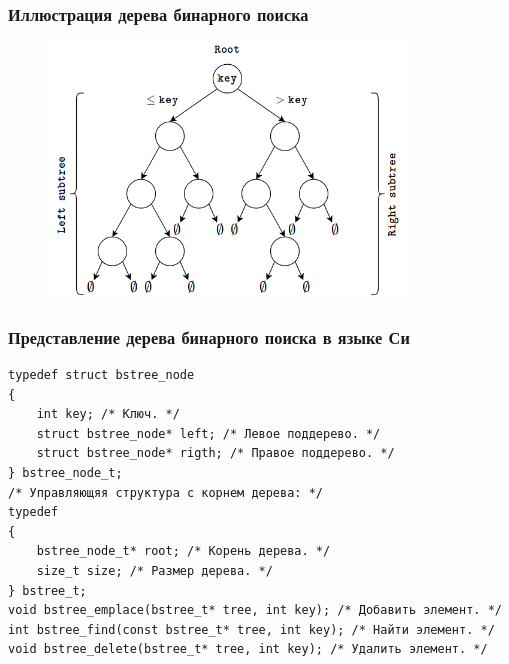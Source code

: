 \documentclass{beamer}
\begin{document}
    \begin{frame}[fragile]
        \frametitle{Иллюстрация дерева бинарного поиска}
        \begin{figure}[!tbp]
           \centering
           \includegraphics[width=0.85\textwidth]{pics/tree.png}
        \end{figure}
    \end{frame}
    \begin{frame}[fragile]
        \frametitle{Представление дерева бинарного поиска в языке Си}
        \begin{verbatim}
typedef struct bstree_node
{
    int key; /* Ключ. */
    struct bstree_node* left; /* Левое поддерево. */
    struct bstree_node* rigth; /* Правое поддерево. */
} bstree_node_t;
/* Управляющяя структура с корнем дерева: */
typedef 
{
    bstree_node_t* root; /* Корень дерева. */
    size_t size; /* Размер дерева. */
} bstree_t;
void bstree_emplace(bstree_t* tree, int key); /* Добавить элемент. */
int bstree_find(const bstree_t* tree, int key); /* Найти элемент. */
void bstree_delete(bstree_t* tree, int key); /* Удалить элемент. */
        \end{verbatim}
    \end{frame}
\end{document}
